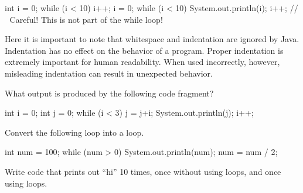 \begin{code}
int i = 0;
while (i < 10)
    i++;
i = 0;
while (i < 10)
    System.out.println(i);
    i++;
// ^^^ Careful! This is not part of the while loop!
\end{code}

Here it is important to note that whitespace and indentation are ignored by Java. Indentation has no effect on the behavior of a program. Proper indentation is extremely important for human readability. When used incorrectly, however, misleading indentation can result in unexpected behavior.

\exercisesection

\begin{exercise}
What output is produced by the following code fragment?

\begin{code}
int i = 0;
int j = 0;
while (i < 3)
{
  j = j+i;
  System.out.println(j);
  i++;
}
\end{code}
\end{exercise}

\begin{exercise}
Convert the following loop into a  loop.

\begin{code}
int num = 100;
while (num > 0)
{
    System.out.println(num);
    num = num / 2;
}
\end{code}
\end{exercise}

\begin{exercise}
  Write code that prints out ``hi'' 10 times, once without using loops, and once
  using loops.
\end{exercise}

